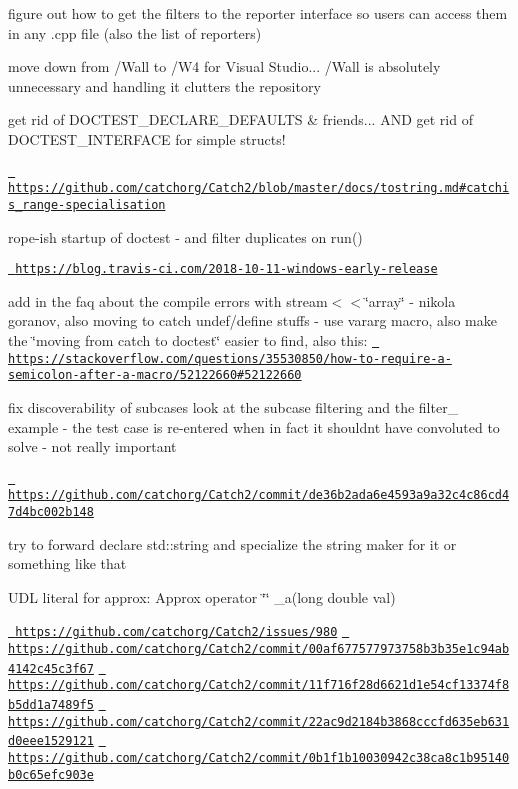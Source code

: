 figure out how to get the filters to the reporter interface so users can access them in any .cpp file (also the list of reporters)

move down from /\+Wall to /\+W4 for Visual Studio... /\+Wall is absolutely unnecessary and handling it clutters the repository

get rid of D\+O\+C\+T\+E\+S\+T\+\_\+\+D\+E\+C\+L\+A\+R\+E\+\_\+\+D\+E\+F\+A\+U\+L\+TS \& friends... A\+ND get rid of D\+O\+C\+T\+E\+S\+T\+\_\+\+I\+N\+T\+E\+R\+F\+A\+CE for simple structs!

\href{https://github.com/catchorg/Catch2/blob/master/docs/tostring.md\#catchis_range-specialisation}{\texttt{ https\+://github.\+com/catchorg/\+Catch2/blob/master/docs/tostring.\+md\#catchis\+\_\+range-\/specialisation}}

rope-\/ish startup of doctest -\/ and filter duplicates on run()

\href{https://blog.travis-ci.com/2018-10-11-windows-early-release}{\texttt{ https\+://blog.\+travis-\/ci.\+com/2018-\/10-\/11-\/windows-\/early-\/release}}

add in the faq about the compile errors with stream$<$$<$\char`\"{}array\char`\"{} -\/ nikola goranov, also moving to catch undef/define stuffs -\/ use vararg macro, also make the \char`\"{}moving from catch to doctest\char`\"{} easier to find, also this\+: \href{https://stackoverflow.com/questions/35530850/how-to-require-a-semicolon-after-a-macro/52122660\#52122660}{\texttt{ https\+://stackoverflow.\+com/questions/35530850/how-\/to-\/require-\/a-\/semicolon-\/after-\/a-\/macro/52122660\#52122660}}

fix discoverability of subcases look at the subcase filtering and the filter\+\_ example -\/ the test case is re-\/entered when in fact it shouldn\textquotesingle{}t have convoluted to solve -\/ not really important

\href{https://github.com/catchorg/Catch2/commit/de36b2ada6e4593a9a32c4c86cd47d4bc002b148}{\texttt{ https\+://github.\+com/catchorg/\+Catch2/commit/de36b2ada6e4593a9a32c4c86cd47d4bc002b148}}

try to forward declare std\+::string and specialize the string maker for it or something like that

U\+DL literal for approx\+: Approx operator \char`\"{}\char`\"{} \+\_\+a(long double val)

\href{https://github.com/catchorg/Catch2/issues/980}{\texttt{ https\+://github.\+com/catchorg/\+Catch2/issues/980}} \href{https://github.com/catchorg/Catch2/commit/00af677577973758b3b35e1c94ab4142c45c3f67}{\texttt{ https\+://github.\+com/catchorg/\+Catch2/commit/00af677577973758b3b35e1c94ab4142c45c3f67}} \href{https://github.com/catchorg/Catch2/commit/11f716f28d6621d1e54cf13374f8b5dd1a7489f5}{\texttt{ https\+://github.\+com/catchorg/\+Catch2/commit/11f716f28d6621d1e54cf13374f8b5dd1a7489f5}} \href{https://github.com/catchorg/Catch2/commit/22ac9d2184b3868cccfd635eb631d0eee1529121}{\texttt{ https\+://github.\+com/catchorg/\+Catch2/commit/22ac9d2184b3868cccfd635eb631d0eee1529121}} \href{https://github.com/catchorg/Catch2/commit/0b1f1b10030942c38ca8c1b95140b0c65efc903e}{\texttt{ https\+://github.\+com/catchorg/\+Catch2/commit/0b1f1b10030942c38ca8c1b95140b0c65efc903e}}

